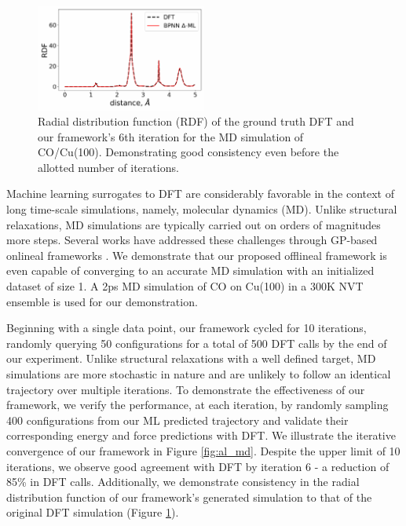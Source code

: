 \documentclass[%
 reprint,
 amsmath,amssymb,
 aps,
]{revtex4-2}
\begin{document}
\begin{figure}
    \centering
    \includegraphics[width=0.5\textwidth]{figures/figure_5.pdf}
    \caption{Radial distribution function (RDF) of the ground truth DFT and our framework's 6th iteration for the MD simulation of CO/Cu(100). Demonstrating good consistency even before the allotted number of iterations.}
    \label{fig:al_rdf}
\end{figure}

Machine learning surrogates to DFT are considerably favorable in the context of long time-scale simulations, namely, molecular dynamics (MD). Unlike structural relaxations, MD simulations are typically carried out on orders of magnitudes more steps. Several works have addressed these challenges through GP-based \gls{onlineal} frameworks \cite{Vandermause2020, Jinnouchi2019}. We demonstrate that our proposed \gls{offlineal} framework is even capable of converging to an accurate MD simulation with an initialized dataset of size 1. A 2ps MD simulation of CO on Cu(100) in a 300K NVT ensemble is used for our demonstration. 

 Beginning with a single data point, our framework cycled for 10 iterations, randomly querying 50 configurations for a total of 500 DFT calls by the end of our experiment. Unlike structural relaxations with a well defined target, MD simulations are more stochastic in nature and are unlikely to follow an identical trajectory over multiple iterations. To demonstrate the effectiveness of our framework, we verify the performance, at each iteration, by randomly sampling 400 configurations from our ML predicted trajectory and validate their corresponding energy and force predictions with DFT. We illustrate the iterative convergence of our framework in Figure \ref{fig:al_md}. Despite the upper limit of 10 iterations, we observe good agreement with DFT by iteration 6 - a reduction of 85\% in DFT calls. Additionally, we demonstrate consistency in the radial distribution function of our framework's generated simulation to that of the original DFT simulation (Figure \ref{fig:al_rdf}).
\end{document}
